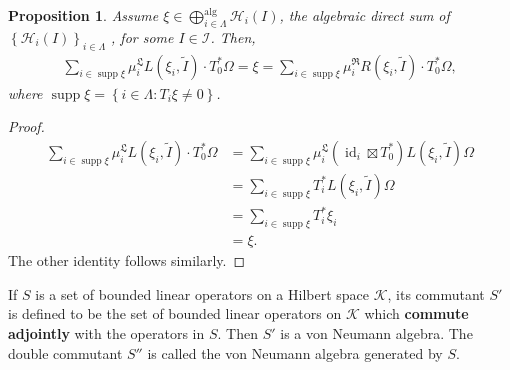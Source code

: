 \documentclass{article}
\newtheorem{proposition}{Proposition}
\newcommand{\hilb}{\mathcal{H}}
\begin{document}
\begin{proposition}\label{cyclicvacuum1}
    Assume $\xi\in\bigoplus^{\operatorname{alg}}_{i\in\Lambda}\hilb_i(I)$, the algebraic direct sum of $\left\{\hilb_i(I)\right\}_{i\in\Lambda}$ , for some $I \in \mathcal{I}$. Then,
    \begin{align*}
        \sum_{i\in\operatorname{supp}\xi}\mu_i^{\mathfrak{L}}L(\xi_i,\widetilde{I}) \cdot T_0^*\Omega = \xi =    \sum_{i\in\operatorname{supp}\xi}\mu_i^{\mathfrak{R}}R(\xi_i,\widetilde{I}) \cdot T_0^*\Omega,
    \end{align*}
    where $\operatorname{supp}\xi = \left\{i\in\Lambda: T_i\xi \neq0 \right\}$. 
\end{proposition}
\begin{proof}
    \begin{align*}
        \sum_{i\in\operatorname{supp}\xi}\mu_i^{\mathfrak{L}}L(\xi_i,\widetilde{I}) \cdot T_0^*\Omega &= \sum_{i\in\operatorname{supp}\xi}\mu_i^{\mathfrak{L}}(\operatorname{id}_i \boxtimes T_0^*)L(\xi_i,\widetilde{I})\Omega \\
        &= \sum_{i\in\operatorname{supp}\xi}T_i^*L(\xi_i,\widetilde{I})\Omega  \\
        & = \sum_{i\in\operatorname{supp}\xi} T^*_i\xi_i\\
        & = \xi. 
    \end{align*}
    The other identity follows similarly. 
\end{proof}



If $S$ is a set of bounded linear operators on a Hilbert space $\mathcal{K}$, its commutant $S'$
is defined to be the set of bounded linear operators on $\mathcal{K}$ which \textbf{commute adjointly} with the operators in $S$. Then $S'$
is a von Neumann algebra. The double commutant $S''$ is called the von Neumann algebra generated by $S$.
\end{document}
